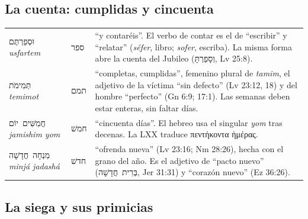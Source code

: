 \documentclass[11pt,letterpaper]{article}
\newcommand{\heb}[1]{\mbox{\foreignlanguage{hebrew}{#1}}}
\newcommand{\grc}[1]{\foreignlanguage{ancientgreek}{#1}}
\begin{document}
\subsection{La cuenta: cumplidas y cincuenta}

\begin{filologia}
\begin{tabular}{@{}L{3.3cm}L{1.5cm}L{9.85cm}@{}}
\heb{וּסְפַרְתֶּם} \emph{usfartem} & \heb{ספר} & ``y contaréis''. El verbo de contar es el de ``escribir'' y ``relatar'' (\emph{séfer}, libro; \emph{sofer}, escriba). La misma forma abre la cuenta del Jubileo (\heb{וְסָפַרְתָּ}, Lv 25:8). \\[2pt]
\heb{תְּמִימֹת} \emph{temimot} & \heb{תמם} & ``completas, cumplidas'', femenino plural de \emph{tamim}, el adjetivo de la víctima ``sin defecto'' (Lv 23:12, 18) y del hombre ``perfecto'' (Gn 6:9; 17:1). Las semanas deben estar enteras, sin faltar días. \\[2pt]
\heb{חֲמִשִּׁים יוֹם} \emph{jamishim yom} & \heb{חמשׁ} & ``cincuenta días''. El hebreo usa el singular \emph{yom} tras decenas. La LXX traduce \grc{πεντήκοντα ἡμέρας}. \\[2pt]
\heb{מִנְחָה חֲדָשָׁה} \emph{minjá jadashá} & \heb{חדשׁ} & ``ofrenda nueva'' (Lv 23:16; Nm 28:26), hecha con el grano del año. Es el adjetivo de ``pacto nuevo'' (\heb{בְּרִית חֲדָשָׁה}, Jer 31:31) y ``corazón nuevo'' (Ez 36:26). \\
\end{tabular}
\end{filologia}

\subsection{La siega y sus primicias}
\end{document}
